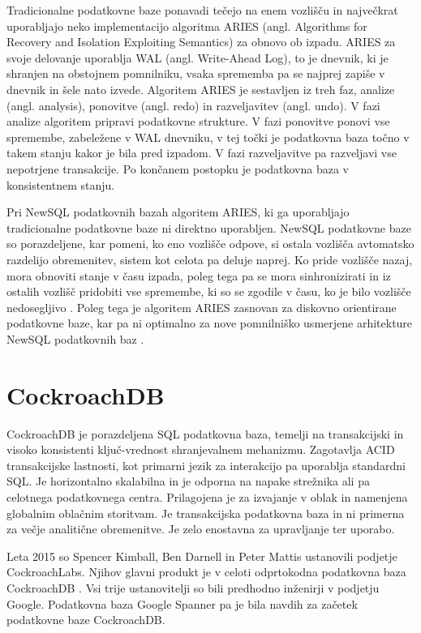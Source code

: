 \documentclass[a4paper, 12pt]{book}
\begin{document}
Tradicionalne podatkovne baze ponavadi tečejo na enem vozlišču in naj\-več\-krat uporabljajo neko implementacijo algoritma ARIES (angl. Algorithms for Recovery and Isolation Exploiting Semantics) \cite{aries} za obnovo ob izpadu. ARIES za svoje delovanje uporablja WAL (angl. Write-Ahead Log), to je dnevnik, ki je shranjen na obstojnem pomnilniku, vsaka sprememba pa se najprej zapiše v dnevnik in šele nato izvede. Algoritem ARIES je sestavljen iz treh faz, analize (angl. analysis), ponovitve (angl. redo) in razveljavitev (angl. undo). V fazi analize algoritem pripravi podatkovne strukture. V fazi ponovitve ponovi vse spremembe, zabeležene v WAL dnevniku, v tej točki je podatkovna baza točno v takem stanju kakor je bila pred izpadom. V fazi razveljavitve pa razveljavi vse nepotrjene transakcije. Po končanem postopku je podatkovna baza v konsistentnem stanju. \cite{Pavlo2016Sep}

Pri NewSQL podatkovnih bazah algoritem ARIES, ki ga uporabljajo tradicionalne podatkovne baze ni direktno uporabljen. NewSQL podatkovne baze so porazdeljene, kar pomeni, ko eno vozlišče odpove, si ostala vozlišča avtomatsko razdelijo obremenitev, sistem kot celota pa deluje naprej. Ko pride vozlišče nazaj, mora obnoviti stanje v času izpada, poleg tega pa se mora sinhronizirati in iz ostalih vozlišč pridobiti vse spremembe, ki so se zgodile v času, ko je bilo vozlišče nedosegljivo \cite{Pavlo2016Sep}. Poleg tega je algoritem ARIES zasnovan za diskovno orientirane podatkovne baze, kar pa ni optimalno za nove pomnilniško usmerjene arhitekture NewSQL podatkovnih baz \cite{zheng2014fast}.




\chapter{CockroachDB}
\label{cockroachdb}
CockroachDB je porazdeljena SQL podatkovna baza, temelji na transakcijski in visoko konsistenti ključ-vrednost shranjevalnem mehanizmu. Zagotavlja ACID transakcijske lastnosti, kot primarni jezik za interakcijo pa uporablja standardni SQL. Je horizontalno skalabilna in je odporna na napake strežnika ali pa celotnega podatkovnega centra. Prilagojena je za izvajanje v oblak in namenjena globalnim oblačnim storitvam. Je transakcijska podatkovna baza in ni primerna za večje analitične obremenitve. Je zelo enostavna za upravljanje ter uporabo. \cite{CRDB-FAQ}

Leta 2015 so Spencer Kimball, Ben Darnell in Peter Mattis ustanovili podjetje CockroachLabs. Njihov glavni produkt je v celoti odprtokodna podatkovna baza CockroachDB \cite{cockroachdb/cockroach}. Vsi trije ustanovitelji so bili predhodno inženirji v podjetju Google. Podatkovna baza Google Spanner pa je bila navdih za začetek podatkovne baze CockroachDB. \cite{CRDB-2017}
\end{document}

